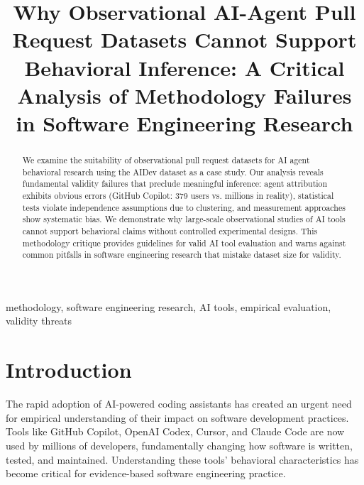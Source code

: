 \documentclass[conference]{IEEEtran}
\begin{document}
\title{Why Observational AI-Agent Pull Request Datasets Cannot Support Behavioral Inference: A Critical Analysis of Methodology Failures in Software Engineering Research}

\author{
}

\maketitle

\begin{abstract}
We examine the suitability of observational pull request datasets for AI agent behavioral research using the AIDev dataset as a case study. Our analysis reveals fundamental validity failures that preclude meaningful inference: agent attribution exhibits obvious errors (GitHub Copilot: 379 users vs. millions in reality), statistical tests violate independence assumptions due to clustering, and measurement approaches show systematic bias. We demonstrate why large-scale observational studies of AI tools cannot support behavioral claims without controlled experimental designs. This methodology critique provides guidelines for valid AI tool evaluation and warns against common pitfalls in software engineering research that mistake dataset size for validity.
\end{abstract}

\begin{IEEEkeywords}
methodology, software engineering research, AI tools, empirical evaluation, validity threats
\end{IEEEkeywords}

\section{Introduction}

The rapid adoption of AI-powered coding assistants has created an urgent need for empirical understanding of their impact on software development practices. Tools like GitHub Copilot, OpenAI Codex, Cursor, and Claude Code are now used by millions of developers, fundamentally changing how software is written, tested, and maintained. Understanding these tools' behavioral characteristics has become critical for evidence-based software engineering practice.
\end{document}
